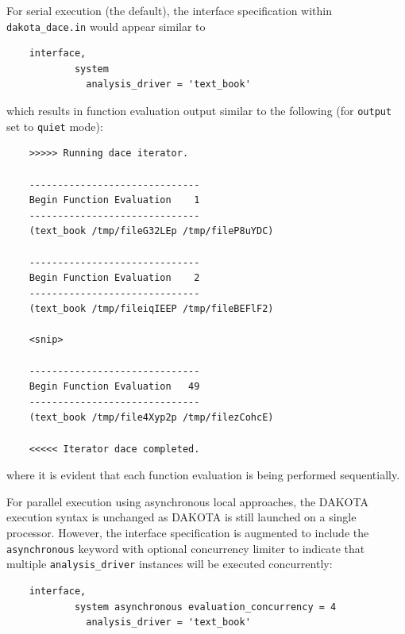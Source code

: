 For serial execution (the default), the interface specification within
\texttt{dakota\_dace.in} would appear similar to
\begin{small}
\begin{verbatim}
    interface,
            system
              analysis_driver = 'text_book'
\end{verbatim}
\end{small}

which results in function evaluation output similar to the following
(for \texttt{output} set to \texttt{quiet} mode):
\begin{small}
\begin{verbatim}
    >>>>> Running dace iterator.

    ------------------------------
    Begin Function Evaluation    1
    ------------------------------
    (text_book /tmp/fileG32LEp /tmp/fileP8uYDC)

    ------------------------------
    Begin Function Evaluation    2
    ------------------------------
    (text_book /tmp/fileiqIEEP /tmp/fileBEFlF2)

    <snip>

    ------------------------------
    Begin Function Evaluation   49
    ------------------------------
    (text_book /tmp/file4Xyp2p /tmp/filezCohcE)

    <<<<< Iterator dace completed.
\end{verbatim}
\end{small}
where it is evident that each function evaluation is being performed
sequentially.

For parallel execution using asynchronous local approaches, the DAKOTA
execution syntax is unchanged as DAKOTA is still launched on a single
processor.  However, the interface specification is augmented to
include the \texttt{asynchronous} keyword with optional concurrency
limiter to indicate that multiple \texttt{analysis\_driver} instances
will be executed concurrently:
\begin{small}
\begin{verbatim}
    interface,
            system asynchronous evaluation_concurrency = 4
              analysis_driver = 'text_book'
\end{verbatim}
\end{small}

